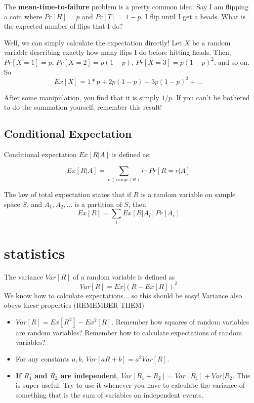 \documentclass[11pt]{article}
\begin{document}
	The \textbf{mean-time-to-failure} problem is a pretty common idea.  Say I am flipping
	a coin where $Pr[H] = p$ and $Pr[T] = 1-p$.  I flip until I get a heads.  What
	is the expected number of flips that I do?
	
	Well, we can simply calculate the expectation directly!  Let $X$ be a random
	variable describing exactly how many flips I do before hitting heads.  Then,
	$Pr[X = 1] = p$, $Pr[X = 2] = p(1-p)$, $Pr[X=3] =p(1-p)^2$, and so on.  So
	$$Ex[X] = 1*p + 2p(1-p) + 3p(1-p)^2 + \ldots$$
	
	After some manipulation, you find that it is simply $1/p$.  If you can't be bothered
	to do the summation yourself, remember this result!
	
	\subsection{Conditional Expectation}
	
	Conditional expectation $Ex[R | A]$ is defined as:
	
	$$Ex[R | A] = \sum_{r \in range(R)} r \cdot Pr[R = r | A]$$
	
	The law of total expectation states that if $R$ is a random variable on sample space $S$, and $A_1, A_2, \ldots$ is a partition of $S$, then
	$$Ex[R] = \sum_i Ex[R | A_i] Pr[A_i]$$
	
	\section{statistics}
	
	The variance $Var[R]$ of a random variable is defined as
	$$Var[R] = Ex[(R - Ex[R])^2$$
	We know how to calculate expectations... so this should be easy!  Variance also
	obeys these properties (REMEMBER THEM)
	
	\begin{itemize}
		\item $Var[R] = Ex[R^2] - Ex^2[R]$.  Remember how squares of random variables are
		random variables?  Remember how to calculate expectations of random variables?
		
		\item For any constants $a, b$, $Var[aR+b] = a^2Var[R]$.  
		
		\item \textbf{If $R_1$ and $R_2$ are independent}, $Var[R_1 + R_2] = Var[R_1] + Var[R_2$.  This is super useful.  Try to use it whenever you have to calculate
		the variance of something that is the sum of variables on independent events. 
	\end{itemize}
	
\end{document}
